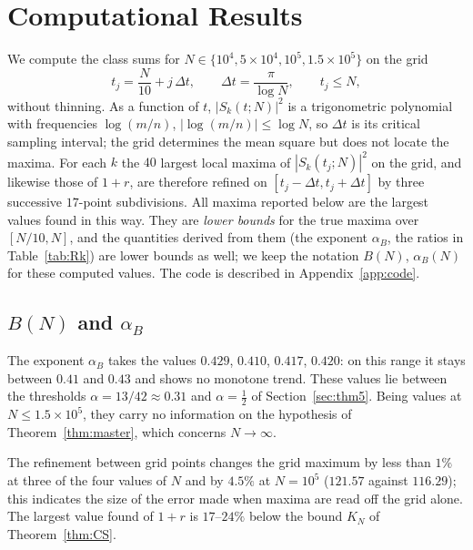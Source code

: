\documentclass[11pt]{amsart}
\theoremstyle{definition}
\theoremstyle{remark}
\newcommand{\half}{\tfrac{1}{2}}
\begin{document}
\section{Computational Results}\label{sec:computation}

We compute the class sums for
$N \in \{10^4, 5 \times 10^4, 10^5, 1.5 \times 10^5\}$ on the grid
\[
  t_j=\frac N{10}+j\,\Delta t,\qquad \Delta t=\frac{\pi}{\log N},\qquad
  t_j\le N ,
\]
without thinning.  As a function of $t$, $|S_k(t;N)|^2$ is a trigonometric
polynomial with frequencies $\log(m/n)$, $|\log(m/n)|\le\log N$, so
$\Delta t$ is its critical sampling interval; the grid determines the mean
square but does not locate the maxima.  For each $k$ the $40$ largest
local maxima of $|S_k(t_j;N)|^2$ on the grid, and likewise those of
$1+r$, are therefore refined on $[t_j-\Delta t,t_j+\Delta t]$ by three
successive $17$-point subdivisions.  All maxima reported below are the
largest values found in this way.  They are \emph{lower bounds} for the
true maxima over $[N/10,N]$, and the quantities derived from them
(the exponent $\alpha_B$, the ratios in Table~\ref{tab:Rk}) are lower
bounds as well; we keep the notation $B(N)$, $\alpha_B(N)$ for these
computed values.  The code is described in Appendix~\ref{app:code}.

\subsection{\texorpdfstring{$B(N)$ and $\alpha_B$}{B(N) and alpha\_B}}

The exponent $\alpha_B$ takes the values $0.429$, $0.410$, $0.417$,
$0.420$: on this range it stays between $0.41$ and $0.43$ and shows no
monotone trend.  These values lie between the thresholds
$\alpha=13/42\approx0.31$ and $\alpha=\half$ of Section~\ref{sec:thm5}.
Being values at $N\le1.5\times10^5$, they carry no information on the
hypothesis of Theorem~\ref{thm:master}, which concerns $N\to\infty$.

The refinement between grid points changes the grid maximum by less than
$1\%$ at three of the four values of $N$ and by $4.5\%$ at $N=10^5$
($121.57$ against $116.29$); this indicates the size of the error made
when maxima are read off the grid alone.  The largest value found of
$1+r$ is $17$--$24\%$ below the bound $K_N$ of Theorem~\ref{thm:CS}.
\end{document}
